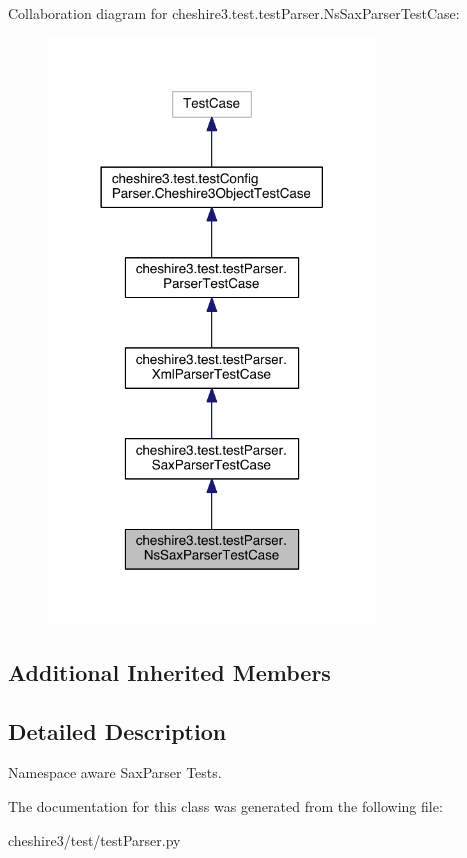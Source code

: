Collaboration diagram for cheshire3.\-test.\-test\-Parser.\-Ns\-Sax\-Parser\-Test\-Case\-:
\nopagebreak
\begin{figure}[H]
\begin{center}
\leavevmode
\includegraphics[width=246pt]{classcheshire3_1_1test_1_1test_parser_1_1_ns_sax_parser_test_case__coll__graph}
\end{center}
\end{figure}
\subsection*{Additional Inherited Members}


\subsection{Detailed Description}
\begin{DoxyVerb}Namespace aware SaxParser Tests.\end{DoxyVerb}
 

The documentation for this class was generated from the following file\-:\begin{DoxyCompactItemize}
\item 
cheshire3/test/test\-Parser.\-py\end{DoxyCompactItemize}
